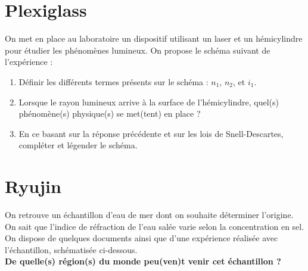 \documentclass[a4paper,11pt,fleqn]{article}%
\begin{document}
\section{Plexiglass}
\begin{minipage}{.5\linewidth}
    On met en place au laboratoire un dispositif utilisant un laser et un hémicylindre pour étudier les phénomènes lumineux. On propose le schéma suivant de l’expérience :
\begin{enumerate}
    \item Définir les différents termes présents sur le schéma : $n_1$, $n_2$, et $i_1$.
    \item Lorsque le rayon lumineux arrive à la surface de l’hémicylindre, quel(s) phénomène(s) physique(s) se met(tent) en place ?
    \item En ce basant sur la réponse précédente et sur les lois de Snell-Descartes, compléter et légender le schéma.
\end{enumerate}
\end{minipage}
\begin{minipage}{.5\linewidth}
\end{minipage}

\section{Ryujin}
On retrouve un échantillon d’eau de mer dont on souhaite déterminer l’origine. On sait que l’indice de réfraction de l’eau salée varie selon la concentration en sel. On dispose de quelques documents ainsi que d’une expérience réalisée avec l’échantillon, schématisée ci-dessous.\\
\textbf{De quelle(s) région(s) du monde peu(ven)t venir cet échantillon ?}\\

\begin{center}
\end{center}
\end{document}
